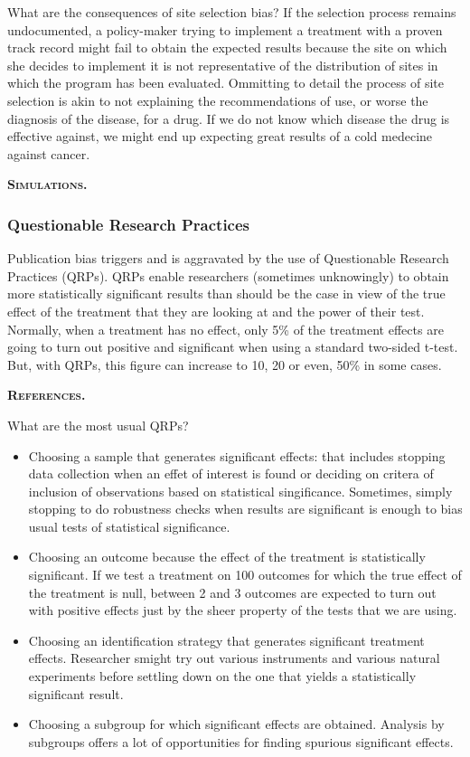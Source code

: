 \documentclass[]{book}
\providecommand{\tightlist}{%
  \setlength{\itemsep}{0pt}\setlength{\parskip}{0pt}}
\theoremstyle{definition}
\theoremstyle{definition}
\theoremstyle{definition}
\theoremstyle{remark}
\begin{document}
What are the consequences of site selection bias?
If the selection process remains undocumented, a policy-maker trying to implement a treatment with a proven track record might fail to obtain the expected results because the site on which she decides to implement it is not representative of the distribution of sites in which the program has been evaluated.
Ommitting to detail the process of site selection is akin to not explaining the recommendations of use, or worse the diagnosis of the disease, for a drug.
If we do not know which disease the drug is effective against, we might end up expecting great results of a cold medecine against cancer.

\textbf{\textsc{Simulations.}}

\hypertarget{questionable-research-practices}{%
\subsubsection{Questionable Research Practices}\label{questionable-research-practices}}

Publication bias triggers and is aggravated by the use of Questionable Research Practices (QRPs).
QRPs enable researchers (sometimes unknowingly) to obtain more statistically significant results than should be the case in view of the true effect of the treatment that they are looking at and the power of their test.
Normally, when a treatment has no effect, only 5\% of the treatment effects are going to turn out positive and significant when using a standard two-sided t-test.
But, with QRPs, this figure can increase to 10, 20 or even, 50\% in some cases.

\textbf{\textsc{References.}}

What are the most usual QRPs?

\begin{itemize}
\tightlist
\item
  Choosing a sample that generates significant effects: that includes stopping data collection when an effet of interest is found or deciding on critera of inclusion of observations based on statistical singificance.
  Sometimes, simply stopping to do robustness checks when results are significant is enough to bias usual tests of statistical significance.
\item
  Choosing an outcome because the effect of the treatment is statistically significant.
  If we test a treatment on 100 outcomes for which the true effect of the treatment is null, between 2 and 3 outcomes are expected to turn out with positive effects just by the sheer property of the tests that we are using.
\item
  Choosing an identification strategy that generates significant treatment effects.
  Researcher smight try out various instruments and various natural experiments before settling down on the one that yields a statistically significant result.
\item
  Choosing a subgroup for which significant effects are obtained.
  Analysis by subgroups offers a lot of opportunities for finding spurious significant effects.
\end{itemize}
\end{document}
